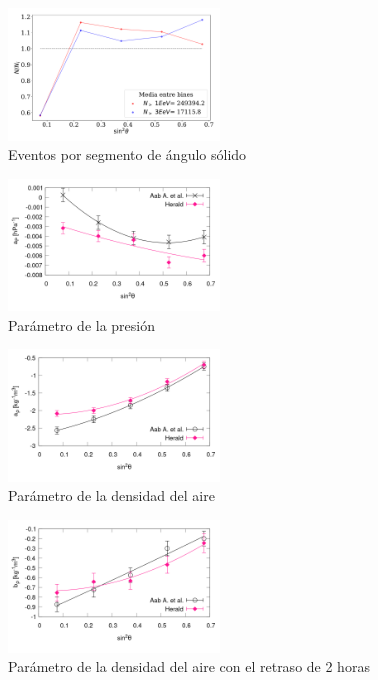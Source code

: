 \begin{figure}[H]
	\centering
	\includegraphics[width=0.5\textwidth]{figura_bines_1_3_EeV.pdf}
	\caption{Eventos por segmento de ángulo sólido}
	\label{fig:angulo}
\end{figure}

\begin{figure}[H]
	\centering
	\includegraphics[width=0.5\textwidth]{figura_a_p.png}
	\caption{Parámetro de la presión}
	\label{fig:ap}
\end{figure}


\begin{figure}[H]
	\centering
	\includegraphics[width=0.5\textwidth]{figura_a_rho.png}
	\caption{Parámetro de la densidad del aire}
	\label{fig:arho}
\end{figure}

\begin{figure}[H]
	\centering
	\includegraphics[width=0.5\textwidth]{figura_b_rho.png}
	\caption{Parámetro de la densidad del aire con el retraso de 2 horas}
	\label{fig:brho}
\end{figure}


